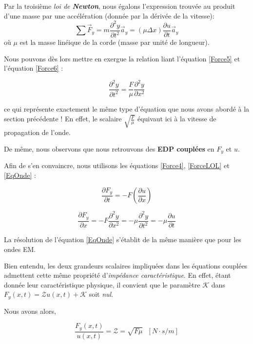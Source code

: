 Par la troisième \textit{loi de \textbf{Newton}}, nous égalons l'expression trouvée au produit d'une masse par une accélération (donnée par la dérivée de la vitesse):
\begin{equation}
\sum \vec{F}_{y}  = m \frac{\partial^{2} y }{\partial t^{2}} \vec{a}_{y} =  (\mu \Delta x) \frac{\partial u }{\partial t} \vec{a}_{y}  
\label{Force6}
\end{equation}
où $\mu$ est la masse linéique de la corde (masse par unité de longueur).

Nous pouvons dès lors mettre en exergue la relation liant l'équation \eqref{Force5} et l'équation \eqref{Force6} : 

\begin{equation}
\frac{\partial^{2} y }{\partial t^{2}} = \frac{F}{\mu}  \frac{\partial^{2} y }{\partial x^{2}}
\label{EqOnde}
\end{equation}

ce qui représente exactement le même type d'équation que nous avons abordé à la section précédente ! 
En effet, le scalaire $\sqrt{\frac{F}{\mu}}$ équivaut ici à la vitesse de propagation de l'onde.

De même, nous observons que nous retrouvons des \textbf{EDP couplées} en $F_{y}$ et $u$.

Afin de s'en convaincre, nous utilisons les équations \eqref{Force4}, \eqref{ForceLOL} et \eqref{EqOnde} :

\[ \frac{\partial F_{y}}{\partial t} = - F \left(\frac{\partial u}{\partial x}\right)\]

\[ \frac{\partial F_{y}}{\partial x} = -F \frac{\partial^{2} y}{\partial x^{2}} = -\mu \frac{\partial^{2} y}{\partial t^{2}} = -\mu \frac{\partial u}{\partial t} \]

La résolution de l'équation \eqref{EqOnde} s'établit de la même manière que pour les ondes EM.
 
Bien entendu, les deux grandeurs scalaires impliquées dans les équations couplées admettent cette même propriété
d'\textit{impédance caractéristique}. En effet, étant donnée leur caractéristique physique, il convient que le paramètre $\mathcal{K}$ 
dans $F_{y}(x,t) = \mathcal{Z}u(x,t) + \mathcal{K}$ soit \textit{nul}.

Nous avons alors, 

\[\frac{F_{y}(x,t)}{u(x,t)} = \mathcal{Z} = \sqrt{F\mu} \hspace{8pt} [N\cdot s / m]\]

